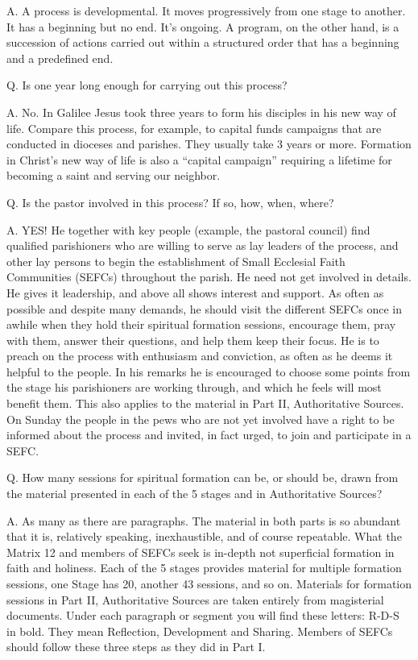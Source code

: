 \documentclass[oneside]{book}
\begin{document}
A. A process is developmental. It moves progressively from one stage to
another. It has a beginning but no end. It's ongoing. A program, on the other
hand, is a succession of actions carried out within a structured order that has
a beginning and a predefined end.

Q. Is one year long enough for carrying out this process?

A. No. In Galilee Jesus took three years to form his disciples in his new way of
life. Compare this process, for example, to capital funds campaigns that are
conducted in dioceses and parishes. They usually take 3 years or more. Formation
in Christ's new way of life is also a ``capital campaign'' requiring a lifetime
for becoming a saint and serving our neighbor.

Q. Is the pastor involved in this process? If so, how, when, where?

A. YES! He together with key people (example, the pastoral council) find
qualified parishioners who are willing to serve as lay leaders of the process,
and other lay persons to begin the establishment of Small Ecclesial Faith
Communities (SEFCs) throughout the parish. He need not get involved in
details. He gives it leadership, and above all shows interest and support.
As often as possible and despite many demands, he should visit the different
SEFCs once in awhile when they hold their spiritual formation sessions,
encourage them, pray with them, answer their questions, and help them keep their
focus.
He is to preach on the process with enthusiasm and conviction, as often as he
deems it helpful to the people. In his remarks he is encouraged to choose some
points from the stage his parishioners are working through, and which he feels
will most benefit them. This also applies to the material in Part II,
Authoritative Sources. On Sunday the people in the pews who are not yet involved
have a right to be informed about the process and invited, in fact urged, to
join and participate in a SEFC.

Q. How many sessions for spiritual formation can be, or should be, drawn from
the material presented in each of the 5 stages and in Authoritative Sources?

A. As many as there are paragraphs. The material in both parts is so abundant
that it is, relatively speaking, inexhaustible, and of course repeatable. What
the Matrix 12 and members of SEFCs seek is in-depth not superficial formation in
faith and holiness. Each of the 5 stages provides material for multiple
formation sessions, one Stage has 20, another 43 sessions, and so on.
Materials for formation sessions in Part II, Authoritative Sources are taken
entirely from magisterial documents. Under each paragraph or segment you will
find these letters: R-D-S in bold. They mean Reflection, Development and
Sharing. Members of SEFCs should follow these three steps as they did in Part I.
\end{document}

